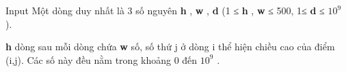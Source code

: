 Input
Một dòng duy nhất là 3 số nguyên   \textbf{    h   }   ,   \textbf{    w   }   ,   \textbf{    d   }   (1 ≤   \textbf{    h   }   ,   \textbf{    w   }   ≤ 500, 1≤   \textbf{    d   }   ≤ $10^{9}$   ).  

\textbf{    h   }   dòng sau mỗi dòng chứa   \textbf{    w   }   số, số thứ j ở dòng i thể hiện chiều cao của điểm (i,j). Các số này đều nằm trong khoảng 0 đến $10^{9}$   .